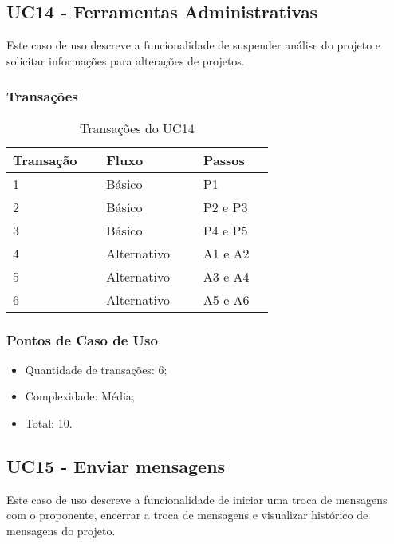 \pagebreak
\subsection{UC14 - Ferramentas Administrativas}
   
  Este caso de uso descreve a funcionalidade de suspender análise do projeto e solicitar informações para alterações de projetos.
  
  \subsubsection{Transações}

  \begin{table*}[!h]
  \centering
  \caption{Transações do UC14}
  \label{uc14_transactions}
    \begin{tabular}{|p{0.20\linewidth}|p{0.25\linewidth}|p{0.20\linewidth}|}
    \hline
    \textbf{Transação} & \textbf{Fluxo} & \textbf{Passos} \\ 
    \hline
    1 & Básico & P1\\
    \hline
    2 & Básico & P2 e P3\\
    \hline
    3 & Básico & P4 e P5\\
    \hline
    4 & Alternativo & A1 e A2\\
    \hline
    5 & Alternativo & A3 e A4\\
    \hline
    6 & Alternativo & A5 e A6\\
    \hline
    \end{tabular}
  \end{table*}

  \subsubsection{Pontos de Caso de Uso}

  \begin{itemize}
  \item Quantidade de transações: 6;
  \item Complexidade: Média;
  \item Total: 10.
  \end{itemize}

  \vfill

\pagebreak
\subsection{UC15 - Enviar mensagens}
  
  Este caso de uso descreve a funcionalidade de iniciar uma troca de
  mensagens com o proponente, encerrar a troca de mensagens e visualizar histórico de mensagens do projeto. 
  
